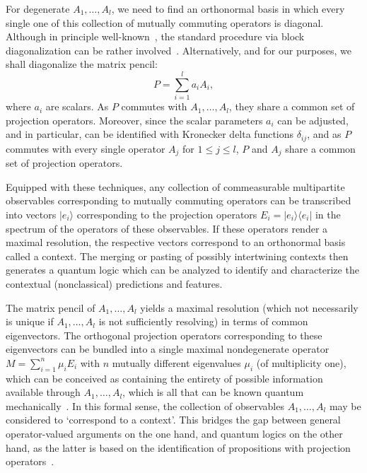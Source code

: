 \documentclass[
  twocolumn,
 showpacs,
 showkeys,
 preprintnumbers,
 amsmath,amssymb,
 aps,
 prl,
  longbibliography,
 floatfix,
 ]{revtex4-2}
\begin{document}
For degenerate $A_1, \ldots, A_l$, we need to find an orthonormal basis in which every single one of this collection of mutually commuting operators is diagonal.
Although in principle well-known~\cite[Section 1.3]{Horn-Johnson-MatrixAnalysis}, the standard procedure via block diagonalization can be rather involved~\cite{Nordgren2020Jun}.
Alternatively, and for our purposes, we shall diagonalize the matrix pencil:
\begin{equation}
P = \sum_{i=1}^{l} a_i A_i,
\label{2024-convert-matrixpencil}
\end{equation}
where $a_i$ are scalars.
As $P$ commutes with $A_1, \ldots, A_l$, they share a common set of projection operators.
Moreover, since the scalar parameters $a_i$ can be adjusted, and in particular, can be identified with Kronecker delta functions $\delta_{ij}$, and as $P$ commutes with every single operator $A_j$ for $1 \le j \le l$, $P$ and $A_j$ share a common set of projection operators.

Equipped with these techniques, any collection of commeasurable multipartite observables corresponding to mutually commuting operators can be transcribed into vectors $|e_i\rangle$ corresponding to the projection operators $E_i = |e_i\rangle \langle e_i|$
in the spectrum of the operators of these observables.
If these operators render a maximal resolution, the respective vectors correspond to an orthonormal basis called a context.
The merging or pasting of possibly intertwining contexts then generates a quantum logic which can be
analyzed to identify and characterize the contextual (nonclassical) predictions and features.

The matrix pencil of $A_1, \ldots, A_l$ yields a maximal resolution (which not necessarily is unique if $A_1, \ldots, A_l$ is not sufficiently resolving)
in terms of common eigenvectors.
The orthogonal projection operators corresponding to these eigenvectors
can be bundled into a single maximal nondegenerate operator $M = \sum_{i=1}^{n} \mu_i E_i$ with $n$ mutually different eigenvalues $\mu_i$ (of multiplicity one),
which can be conceived as containing the entirety of possible information available through $A_1, \ldots, A_l$,
which is all that can be known quantum mechanically~\cite{zeil-99}.
In this formal sense, the collection of observables $A_1, \ldots, A_l$ may be considered to `correspond to a context'.
This bridges the gap between general operator-valued arguments on the one hand, and quantum logics on the other hand,
as the latter is based on the identification of propositions with projection operators~\cite{birkhoff-36}.
\end{document}
